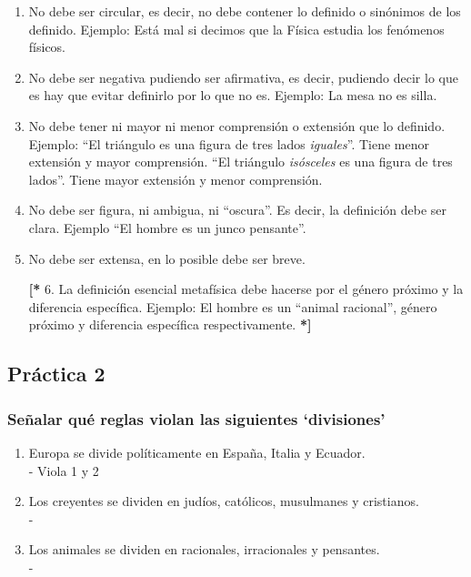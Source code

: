 \documentclass{article}
\begin{document}
\begin{enumerate}
    \item No debe ser circular, es decir, no debe contener lo definido o sinónimos de los definido. Ejemplo: Está mal si decimos que la Física estudia los fenómenos físicos.
    \item No debe ser negativa pudiendo ser afirmativa, es decir, pudiendo decir lo que es hay que evitar definirlo por lo que no es. Ejemplo: La mesa no es silla.
    \item No debe tener ni mayor ni menor comprensión o extensión que lo definido. Ejemplo: ``El triángulo es una figura de tres lados \emph{iguales}''. Tiene menor extensión y mayor comprensión. ``El triángulo \emph{isósceles} es  una figura de tres lados''. Tiene mayor extensión y menor comprensión.
    \item No debe ser figura, ni ambigua, ni ``oscura''. Es decir, la definición debe ser clara. Ejemplo ``El hombre es un junco pensante''.
    \item No debe ser extensa, en lo posible debe ser breve.
    \item[ \textbf{[*} 6.] La definición esencial metafísica debe hacerse por el género próximo y la diferencia específica. Ejemplo: El hombre es un ``animal racional'', género próximo y diferencia específica respectivamente. \textbf{*]}
\end{enumerate}
    
\newpage
    
\subsection{Práctica 2}
    
\subsubsection{Señalar qué reglas violan las siguientes `divisiones'}
\begin{enumerate}
    \item Europa se divide políticamente en España, Italia y Ecuador. \\
    - Viola 1 y 2
    \item Los creyentes se dividen en judíos, católicos, musulmanes y cristianos. \\
    -
    \item Los animales se dividen en racionales, irracionales y pensantes. \\
    -
\end{enumerate}
    
\end{document}
